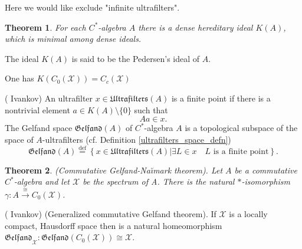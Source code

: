 \documentclass{beamer}
\theoremstyle{plain}
\newtheorem{thm}{Theorem}%
\newcommand{\sX}{\mathcal{X}}       %
\newcommand{\bydef}{\stackrel{\mathrm{def}}{=}}
\begin{document}
\begin{frame}
Here we would like exclude "infinite ultrafilters".
	\begin{thm}\label{pedersen_ideal_thm}  
	For each $C^*$-algebra $A$ there is a dense hereditary ideal $K(A)$,
	which is minimal among dense ideals.
	\end{thm}
\begin{definition}\label{pedersen_ideal_defn}
	The ideal $K\left( A\right) $  is said to be the \alert{ Pedersen's ideal of $A$}. %
	\end{definition}
	One has $K\left( C_0\left( \sX\right) \right) = C_c\left(\sX \right)$ 
	\begin{definition}\label{gelfand_space_defn}(\alert{ Ivankov})
		An ultrafilter  $x \in \mathfrak{Ultrafilters}\left(A \right)$ is a \alert{finite point} if there is a nontrivial element $a\in K\left( A\right)\setminus\{0\}$ such that 
		$$
		Aa \in x.
		$$
		The \alert{Gelfand space} $\mathfrak{Gelfand}\left(A \right)$ of $C^*$-algebra $A$ is a topological subspace  of the {space of} $A$-{ultrafilters} (cf. Definition \ref{ultrafilters_space_defn})
		$$
		\mathfrak{Gelfand}\left(A \right)\bydef \left\{\left. x \in \mathfrak{Ultrafilters}\left(A \right)\right| \exists L \in x \quad L \text{ is a finite point}\right\}.
		$$
	\end{definition}
	
\end{frame}
\begin{frame}
	\begin{thm}\label{gelfand-naimark_thm} (Commutative Gelfand-Na\u{\i}mark theorem). 
		Let $A$ be a commutative $C^*$-algebra and let $\mathcal{X}$ be the spectrum of A. There is the natural $*$-isomorphism $\gamma:A \xrightarrow{\cong} C_0(\mathcal{X})$.
	\end{thm}
\begin{lemma}\label{lem_g_lem} (\alert{ Ivankov}) (Generalized commutative Gelfand theorem).
	If $\sX$ is a locally compact, Hausdorff space then  is a natural  homeomorphism $ \mathfrak{Gelfand}_\sX: \mathfrak{Gelfand}\left(C_0\left( \sX\right)  \right)\cong \sX$.
	\end{lemma}
	
\end{frame}
\end{document}
